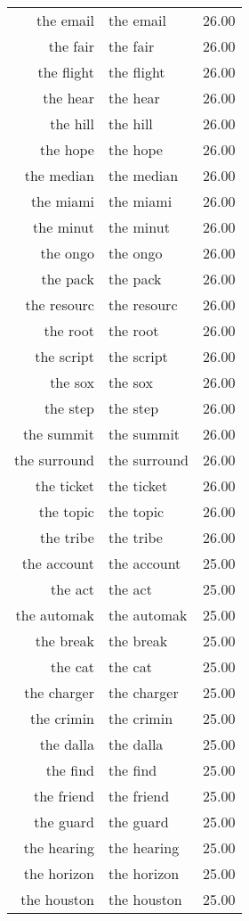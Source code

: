 \begin{table}[ht]
\begin{tabular}{rlr}
  the email & the email & 26.00 \\ 
  the fair & the fair & 26.00 \\ 
  the flight & the flight & 26.00 \\ 
  the hear & the hear & 26.00 \\ 
  the hill & the hill & 26.00 \\ 
  the hope & the hope & 26.00 \\ 
  the median & the median & 26.00 \\ 
  the miami & the miami & 26.00 \\ 
  the minut & the minut & 26.00 \\ 
  the ongo & the ongo & 26.00 \\ 
  the pack & the pack & 26.00 \\ 
  the resourc & the resourc & 26.00 \\ 
  the root & the root & 26.00 \\ 
  the script & the script & 26.00 \\ 
  the sox & the sox & 26.00 \\ 
  the step & the step & 26.00 \\ 
  the summit & the summit & 26.00 \\ 
  the surround & the surround & 26.00 \\ 
  the ticket & the ticket & 26.00 \\ 
  the topic & the topic & 26.00 \\ 
  the tribe & the tribe & 26.00 \\ 
  the account & the account & 25.00 \\ 
  the act & the act & 25.00 \\ 
  the automak & the automak & 25.00 \\ 
  the break & the break & 25.00 \\ 
  the cat & the cat & 25.00 \\ 
  the charger & the charger & 25.00 \\ 
  the crimin & the crimin & 25.00 \\ 
  the dalla & the dalla & 25.00 \\ 
  the find & the find & 25.00 \\ 
  the friend & the friend & 25.00 \\ 
  the guard & the guard & 25.00 \\ 
  the hearing & the hearing & 25.00 \\ 
  the horizon & the horizon & 25.00 \\ 
  the houston & the houston & 25.00 \\ 

\end{tabular}
\end{table}
